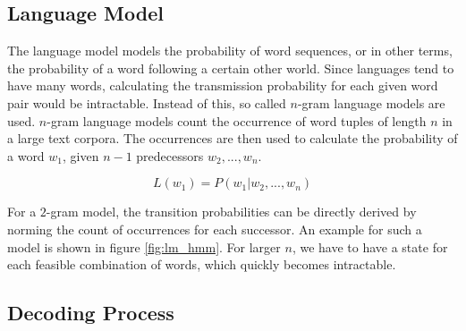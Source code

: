 \subsection{Language Model}
\label{sec:language_model}
The language model models the probability of word sequences, or in other terms, the probability of a word following a certain other world. Since languages tend to have many words, calculating the transmission probability for each given word pair would be intractable. Instead of this, so called $n$-gram language models are used. $n$-gram language models count the occurrence of word tuples of length $n$ in a large text corpora. The occurrences are then used to calculate the probability of a word $w_1$, given $n - 1$ predecessors $w_2, ..., w_n$.

\[
L(w_1) = P(w_1|w_2,...,w_n)
\]

For a $2$-gram model, the transition probabilities can be directly derived by norming the count of occurrences for each successor. An example for such a model is shown in figure \ref{fig:lm_hmm}. For larger $n$, we have to have a state for each feasible combination of words, which quickly becomes intractable. 

\begin{minipage}{\linewidth}
	\label{fig:lm_hmm}
	\hspace{1cm}
\end{minipage}


\subsection{Decoding Process}

